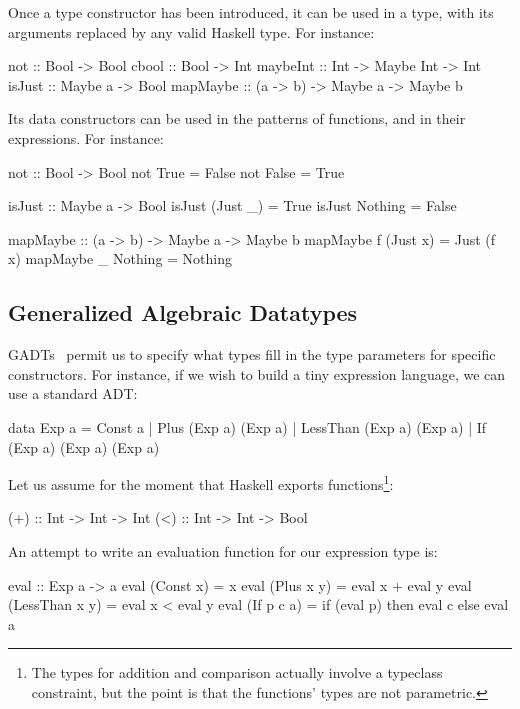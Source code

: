 Once a type constructor has been introduced, it can be used in a type, with
its arguments replaced by any valid Haskell type. For instance:

\begin{code}
not      :: Bool -> Bool
cbool    :: Bool -> Int
maybeInt :: Int -> Maybe Int -> Int
isJust   :: Maybe a -> Bool
mapMaybe :: (a -> b) -> Maybe a -> Maybe b
\end{code}

Its data constructors can be used in the patterns of functions, and in their
expressions. For instance:

\begin{code}
not :: Bool -> Bool
not True  = False
not False = True

isJust :: Maybe a -> Bool
isJust (Just _) = True
isJust Nothing  = False

mapMaybe :: (a -> b) -> Maybe a -> Maybe b
mapMaybe f (Just x) = Just (f x)
mapMaybe _ Nothing  = Nothing
\end{code}

\subsection{Generalized Algebraic Datatypes}
\label{subsection:Haskell_Concepts-Datatypes_and_Pattern_Matching-Generalized_Algebraic_Datatypes}

GADTs~\cite{Cheney2003,Xi2003} permit us to specify what types fill in the type
parameters for specific constructors. For instance, if we wish to build a tiny
expression language, we can use a standard ADT:

\begin{code}
data Exp a = Const a 
           | Plus (Exp a) (Exp a)
           | LessThan (Exp a) (Exp a)
           | If (Exp a) (Exp a) (Exp a)
\end{code}

Let us assume for the moment that Haskell exports functions\footnote{The types
for addition and comparison actually involve a typeclass constraint, but the
point is that the functions' types are not parametric.}:

\begin{code}
(+)  :: Int -> Int -> Int
(<)  :: Int -> Int -> Bool
\end{code}

An attempt to write an evaluation function for our expression type is:

\begin{code}
eval :: Exp a -> a
eval (Const x)  = x
eval (Plus x y) = eval x + eval y
eval (LessThan x y) = eval x < eval y
eval (If p c a) = if (eval p)
                  then eval c
                  else eval a
\end{code}

